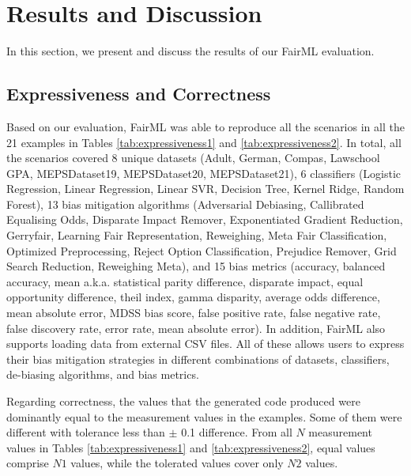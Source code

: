 \documentclass[sigconf,review]{acmart}
\begin{document}
\section{Results and Discussion}
\label{sec:result_and_discussion}
In this section, we present and discuss the results of our FairML evaluation.

\subsection{Expressiveness and Correctness}
\label{sec:expressiveness_and_correctness}
Based on our evaluation, FairML was able to reproduce all the scenarios in all the 21 examples in Tables \ref{tab:expressiveness1} and \ref{tab:expressiveness2}. In total, all the scenarios covered 8 unique datasets (Adult, German, Compas, Lawschool GPA, MEPSDataset19, MEPSDataset20, MEPSDataset21), 6 classifiers (Logistic Regression, Linear Regression, Linear SVR, Decision Tree, Kernel Ridge, Random Forest), 13 bias mitigation algorithms (Adversarial Debiasing, Callibrated Equalising Odds, Disparate Impact Remover, Exponentiated Gradient Reduction, Gerryfair, Learning Fair Representation, Reweighing, Meta Fair Classification, Optimized Preprocessing, Reject Option Classification, Prejudice Remover, Grid Search Reduction, Reweighing Meta), and 15 bias metrics (accuracy, balanced accuracy, mean a.k.a. statistical parity difference, disparate impact, equal opportunity difference, theil index, gamma disparity, average odds difference, mean absolute error, MDSS bias score, false positive rate, false negative rate, false discovery rate, error rate, mean absolute error). In addition, FairML also supports loading data from external CSV files. All of these allows users to express their bias mitigation strategies in different combinations of datasets, classifiers, de-biasing algorithms, and bias metrics.

Regarding correctness, the values that the generated code produced were dominantly equal to the measurement values in the examples. Some of them were different with tolerance less than $\pm$ 0.1 difference. From all $N$ measurement values in Tables \ref{tab:expressiveness1} and \ref{tab:expressiveness2}, equal values comprise $N1$ values, while the tolerated values cover only $N2$ values.  

\end{document}
